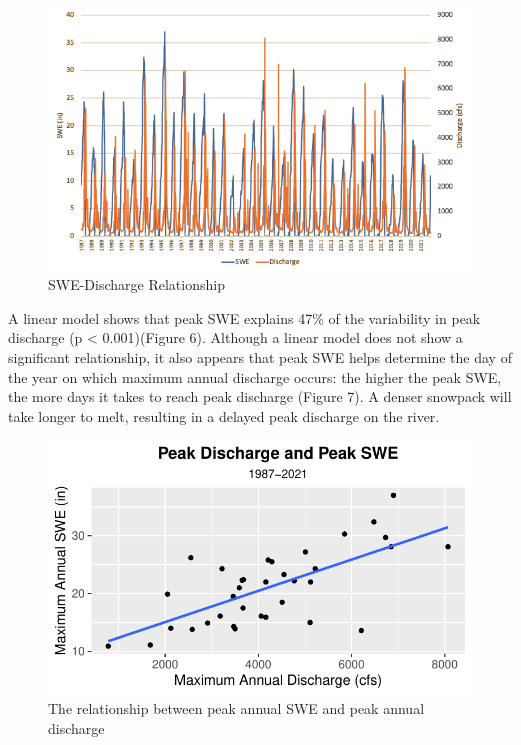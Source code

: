 \documentclass[
  12pt,
]{article}
\begin{document}
\begin{figure}
\centering
\includegraphics{snowpack_discharge_plot.png}
\caption{SWE-Discharge Relationship}
\end{figure}

A linear model shows that peak SWE explains 47\% of the variability in
peak discharge (p \textless{} 0.001)(Figure 6). Although a linear model
does not show a significant relationship, it also appears that peak SWE
helps determine the day of the year on which maximum annual discharge
occurs: the higher the peak SWE, the more days it takes to reach peak
discharge (Figure 7). A denser snowpack will take longer to melt,
resulting in a delayed peak discharge on the river.

\begin{figure}
\centering
\includegraphics{McLaughlin_WDA_Project_files/figure-latex/unnamed-chunk-5-1.pdf}
\caption{The relationship between peak annual SWE and peak annual
discharge}
\end{figure}
\end{document}
